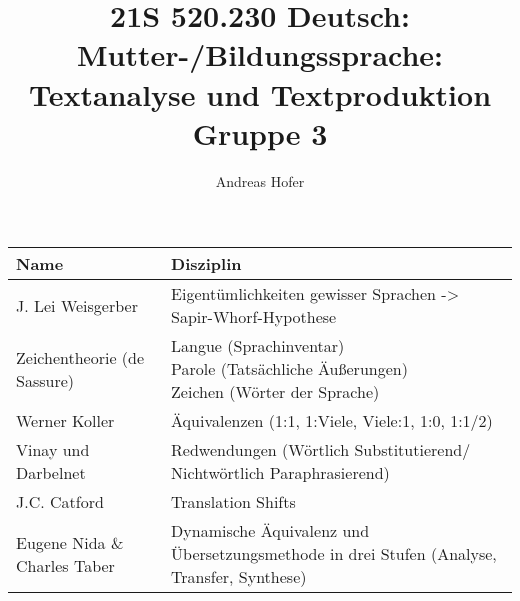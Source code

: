 \documentclass{article}
\title{\vspace{-3cm}21S 520.230 Deutsch: Mutter-/Bildungssprache: Textanalyse und Textproduktion Gruppe 3}
\author{Andreas Hofer}
\begin{document}
	\begin{tabular}{| l | l |}
		\toprule
		Name & Disziplin \\ \midrule
		J. Lei Weisgerber & Eigentümlichkeiten gewisser Sprachen -> Sapir-Whorf-Hypothese \\ \hline
		Zeichentheorie (de Sassure) & \makecell[l]{ Langue (Sprachinventar) \\ Parole (Tatsächliche Äußerungen) \\ Zeichen (Wörter der Sprache)} \\ \hline
		Werner Koller & Äquivalenzen (1:1, 1:Viele, Viele:1, 1:0, 1:1/2) \\ \hline
		Vinay und Darbelnet & Redwendungen (Wörtlich Substitutierend/ Nichtwörtlich Paraphrasierend) \\ \hline
		J.C. Catford & Translation Shifts \\ \hline
		Eugene Nida \& Charles Taber & Dynamische Äquivalenz und Übersetzungsmethode in drei Stufen (Analyse, Transfer, Synthese) \\

		\bottomrule
	\end{tabular}
	
\end{document}
